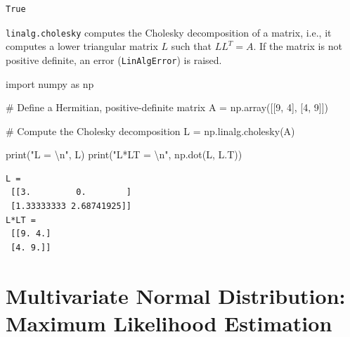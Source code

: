 \documentclass[
  letterpaper,
  DIV=11,
  numbers=noendperiod]{scrreprt}
\newenvironment{Shaded}{\begin{snugshade}}{\end{snugshade}}
\newcommand{\BuiltInTok}[1]{\textcolor[rgb]{0.00,0.23,0.31}{#1}}
\newcommand{\CharTok}[1]{\textcolor[rgb]{0.13,0.47,0.30}{#1}}
\newcommand{\CommentTok}[1]{\textcolor[rgb]{0.37,0.37,0.37}{#1}}
\newcommand{\DecValTok}[1]{\textcolor[rgb]{0.68,0.00,0.00}{#1}}
\newcommand{\ImportTok}[1]{\textcolor[rgb]{0.00,0.46,0.62}{#1}}
\newcommand{\NormalTok}[1]{\textcolor[rgb]{0.00,0.23,0.31}{#1}}
\newcommand{\OperatorTok}[1]{\textcolor[rgb]{0.37,0.37,0.37}{#1}}
\newcommand{\StringTok}[1]{\textcolor[rgb]{0.13,0.47,0.30}{#1}}
\begin{document}
\begin{verbatim}
True
\end{verbatim}

\begin{tcolorbox}[enhanced jigsaw, arc=.35mm, colback=white, bottomtitle=1mm, toprule=.15mm, coltitle=black, titlerule=0mm, leftrule=.75mm, title=\textcolor{quarto-callout-note-color}{\faInfo}\hspace{0.5em}{Example: Cholesky decomposition.}, opacitybacktitle=0.6, breakable, colbacktitle=quarto-callout-note-color!10!white, opacityback=0, toptitle=1mm, rightrule=.15mm, left=2mm, colframe=quarto-callout-note-color-frame, bottomrule=.15mm]

\texttt{linalg.cholesky} computes the Cholesky decomposition of a
matrix, i.e., it computes a lower triangular matrix \(L\) such that
\(LL^T = A\). If the matrix is not positive definite, an error
(\texttt{LinAlgError}) is raised.

\begin{Shaded}
\begin{Highlighting}[]
\ImportTok{import}\NormalTok{ numpy }\ImportTok{as}\NormalTok{ np}

\CommentTok{\# Define a Hermitian, positive{-}definite matrix}
\NormalTok{A }\OperatorTok{=}\NormalTok{ np.array([[}\DecValTok{9}\NormalTok{, }\DecValTok{4}\NormalTok{], [}\DecValTok{4}\NormalTok{, }\DecValTok{9}\NormalTok{]]) }

\CommentTok{\# Compute the Cholesky decomposition}
\NormalTok{L }\OperatorTok{=}\NormalTok{ np.linalg.cholesky(A)}

\BuiltInTok{print}\NormalTok{(}\StringTok{"L = }\CharTok{\textbackslash{}n}\StringTok{"}\NormalTok{, L)}
\BuiltInTok{print}\NormalTok{(}\StringTok{"L*LT = }\CharTok{\textbackslash{}n}\StringTok{"}\NormalTok{, np.dot(L, L.T))}
\end{Highlighting}
\end{Shaded}

\begin{verbatim}
L = 
 [[3.         0.        ]
 [1.33333333 2.68741925]]
L*LT = 
 [[9. 4.]
 [4. 9.]]
\end{verbatim}

\end{tcolorbox}

\hypertarget{multivariate-normal-distribution-maximum-likelihood-estimation}{%
\section{Multivariate Normal Distribution: Maximum Likelihood
Estimation}\label{multivariate-normal-distribution-maximum-likelihood-estimation}}
\end{document}
